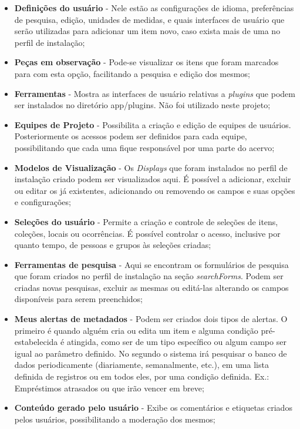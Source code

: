 \documentclass[a4paper,12pt,oneside,onecolumn,final,fleqn]{repUERJ}
\begin{document}
\begin{itemize}
	\item \textbf{Definições do usuário} - Nele estão as configurações de idioma, preferências de pesquisa, edição, unidades de medidas, e quais interfaces de usuário que serão utilizadas para adicionar um item novo, caso exista mais de uma no perfil de instalação;
	\item \textbf{Peças em observação} - Pode-se visualizar os itens que foram marcados para com esta opção, facilitando a pesquisa e edição dos mesmos;
	\item \textbf{Ferramentas} - Mostra as interfaces de usuário relativas a \textit{plugins} que podem ser instalados no diretório app/plugins. Não foi utilizado neste projeto;
	\item \textbf{Equipes de Projeto} - Possibilita a criação e edição de equipes de usuários. Posteriormente os acessos podem ser definidos para cada equipe, possibilitando que cada uma fique responsável por uma parte do acervo;
	\item \textbf{Modelos de Visualização} - Os \textit{Displays} que foram instalados no perfil de instalação criado podem ser visualizados aqui. É possível a adicionar, excluir ou editar os já existentes, adicionando ou removendo os campos e suas opções e configurações;
	\item \textbf{Seleções do usuário} - Permite a criação e controle de seleções de itens, coleções, locais ou ocorrências. É possível controlar o acesso, inclusive por quanto tempo, de pessoas e grupos às seleções criadas;
	\item \textbf{Ferramentas de pesquisa} - Aqui se encontram os formulários de pesquisa que foram criados no perfil de instalação na seção \textit{searchForms}. Podem ser criadas novas pesquisas, excluir as mesmas ou editá-las alterando os campos disponíveis para serem preenchidos;
	\item \textbf{Meus alertas de metadados} - Podem ser criados dois tipos de alertas. O primeiro é quando alguém cria ou edita um item e alguma condição pré-estabelecida é atingida, como ser de um tipo específico ou algum campo ser igual ao parâmetro definido. No segundo o sistema irá pesquisar o banco de dados periodicamente (diariamente, semanalmente, etc.), em uma lista definida de registros ou em todos eles, por uma condição definida. Ex.: Empréstimos atrasados ou que irão vencer em breve;
	\item \textbf{Conteúdo gerado pelo usuário} - Exibe os comentários e etiquetas criados pelos usuários, possibilitando a moderação dos mesmos;

\end{itemize}
\end{document}
